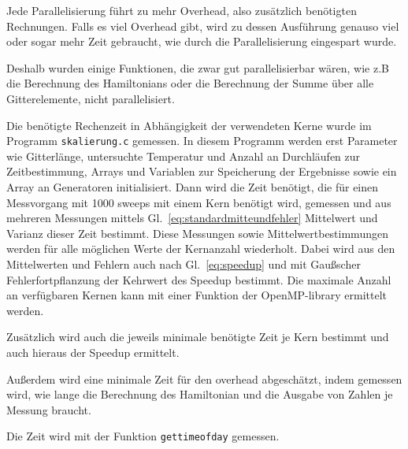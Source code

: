 	Jede Parallelisierung führt zu mehr Overhead, also zusätzlich benötigten Rechnungen. Falls es viel Overhead gibt, wird zu dessen Ausführung genauso viel oder sogar mehr Zeit gebraucht, wie durch die Parallelisierung eingespart wurde.
	
	Deshalb wurden einige Funktionen, die zwar gut parallelisierbar wären, wie z.B die Berechnung des Hamiltonians oder die Berechnung der Summe über alle Gitterelemente, nicht parallelisiert.
	
	Die benötigte Rechenzeit in Abhängigkeit der verwendeten Kerne wurde im Programm \texttt{skalierung.c} gemessen. In diesem Programm werden erst Parameter wie Gitterlänge, untersuchte Temperatur und Anzahl an Durchläufen zur Zeitbestimmung, Arrays und Variablen zur Speicherung der Ergebnisse sowie ein Array an Generatoren initialisiert. Dann wird die Zeit benötigt, die für einen Messvorgang mit 1000 sweeps mit einem Kern benötigt wird, gemessen und aus mehreren Messungen mittels Gl.~\ref{eq:standardmitteundfehler} Mittelwert und Varianz dieser Zeit bestimmt. Diese Messungen sowie Mittelwertbestimmungen werden für alle möglichen Werte der Kernanzahl wiederholt. Dabei wird aus den Mittelwerten und Fehlern auch nach Gl.~\ref{eq:speedup} und mit Gaußscher Fehlerfortpflanzung der Kehrwert des Speedup bestimmt. Die maximale Anzahl an verfügbaren Kernen kann mit einer Funktion der OpenMP-library ermittelt werden. 
	
	Zusätzlich wird auch die jeweils minimale benötigte Zeit je Kern bestimmt und auch hieraus der Speedup ermittelt.
	
	Außerdem wird eine minimale Zeit für den overhead abgeschätzt, indem gemessen wird, wie lange die Berechnung des Hamiltonian und die Ausgabe von Zahlen je Messung braucht. 
	
	Die Zeit wird mit der Funktion \texttt{gettimeofday} gemessen.
	

	
